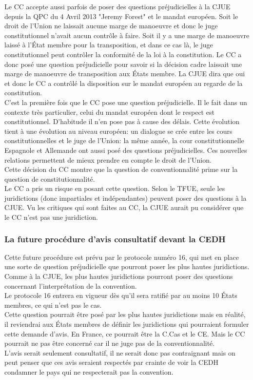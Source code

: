\documentclass[10pt, a4paper, openany]{book}
\begin{document}
Le CC accepte aussi parfois de poser des questions préjudicielles à la CJUE depuis la QPC du 4 Avril 2013 "Jeremy Forest" et le mandat européen. Soit le droit de l'Union ne laissait aucune marge de manoeuvre et donc le juge constitutionnel n'avait aucun contrôle à faire. Soit il y a une marge de manoeuvre laissé à l'État membre pour la transposition, et dans ce cas là, le juge constitutionnel peut contrôler la conformité de la loi à la constitution. Le CC a donc posé une question préjudicielle pour savoir si la décision cadre laissait une marge de manoeuvre de transposition aux États membre. La CJUE dira que oui et donc le CC a contrôlé la disposition sur le mandat européen au regarde de la constitution. \\
C'est la première fois que le CC pose une question préjudicielle. Il le fait dans un contexte très particulier, celui du mandat européen dont le respect est constitutionnel. D'habitude il n'en pose pas à cause des délais. Cette évolution tient à une évolution au niveau européen: un dialogue se crée entre les cours constitutionnelles et le juge de l'Union: la même année, la cour constitutionnelle Espagnole et Allemande ont aussi posé des questions préjudicielles. Ces nouvelles relations permettent de mieux prendre en compte le droit de l'Union. \\
Cette décision du CC montre que la question de conventionnalité prime sur la question de constitutionnalité. \\
Le CC a pris un risque en posant cette question. Selon le TFUE, seule les juridictions (donc impartiales et indépendantes) peuvent poser des questions à la CJUE. Vu les critiques qui sont faites au CC, la CJUE aurait pu considérer que le CC n'est pas une juridiction. 

\subsubsection{La future procédure d'avis consultatif devant la CEDH}

Cette future procédure est prévu par le protocole numéro 16, qui met en place une sorte de question préjudicielle que pourront poser les plus hautes juridictions. Comme à la CJUE, les plus hautes juridictions pourront poser des questions concernant l'interprétation de la convention. \\
Le protocole 16 entrera en vigueur dès qu'il sera ratifié par au moins 10 États membres, ce qui n'est pas le cas. \\
Cette question pourrait être posé par les plus hautes juridictions mais en réalité, il reviendrai aux États membres de définir les juridictions qui pourraient formuler cette demande d'avis. En France, ce pourrait être la C.Cas et le CE. Mais le CC pourrait ne pas être concerné car il ne juge pas de la conventionnalité. \\
L'avis serait seulement consultatif, il ne serait donc pas contraignant mais on peut penser que ces avis seraient respectés par crainte de voir la CEDH condamner le pays qui ne respecterait pas la convention. 
\end{document}
